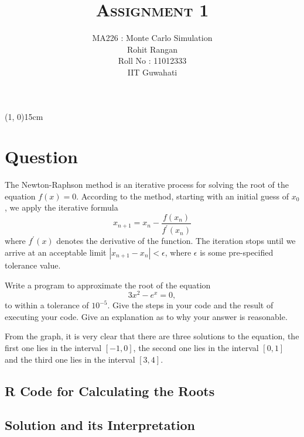 \documentclass[10pt]{article}
\begin{document}
\title{\textbf{\textsc{Assignment 1}}}
\author{MA226 : Monte Carlo Simulation \\
			Rohit Rangan \\
			Roll No : 11012333 \\
			IIT Guwahati}
\date{}
\maketitle

\begin{center}
	\line(1, 0){15cm}
\end{center}

\section{Question}
The Newton-Raphson method is an iterative process for solving the root of the equation $f(x) = 0$. According to the method, starting with an initial guess of $x_{0}$, we apply the iterative formula $$x_{n+1} = x_{n} - \frac{ f(x_{n})}{f^{'}(x_{n})}$$ where $f^{'}(x)$ denotes the derivative of the function. The iteration stops until we arrive at an acceptable limit $\left|x_{n+1} - x_{n}\right| < \epsilon$, where $\epsilon$ is some pre-specified tolerance value. \medskip

Write a program to approximate the root of the equation $$3x^2 - e^x = 0,$$ to within a tolerance of $10^{-5}$. Give the steps in your code and the result of executing your code. Give an explanation as to why your answer is reasonable.



From the graph, it is very clear that there are three solutions to the equation, the first one lies in the interval $[-1,0]$, the second one lies in the interval $[0,1]$ and the third one lies in the interval $[3,4]$. \medskip

\subsection{R Code for Calculating the Roots}



\medskip

\subsection{Solution and its Interpretation}
\end{document}
